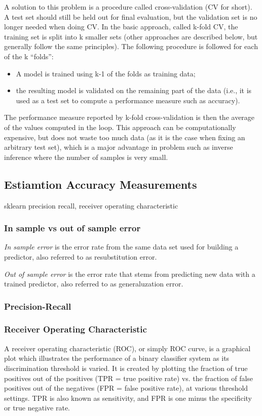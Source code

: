 \documentclass[11pt]{article}
\theoremstyle{plain}
\theoremstyle{definition}
\begin{document}
A solution to this problem is a procedure called cross-validation (CV for short). A test set should still be held out for final evaluation, but the validation set is no longer needed when doing CV. In the basic approach, called k-fold CV, the training set is split into k smaller sets (other approaches are described below, but generally follow the same principles). The following procedure is followed for each of the k “folds”:

\begin{itemize}
	\item A model is trained using k-1 of the folds as training data;
	\item the resulting model is validated on the remaining part of the data (i.e., it is used as a test set to compute a performance measure such as accuracy).
\end{itemize}
The performance measure reported by k-fold cross-validation is then the average of the values computed in the loop. This approach can be computationally expensive, but does not waste too much data (as it is the case when fixing an arbitrary test set), which is a major advantage in problem such as inverse inference where the number of samples is very small.

\subsection{Estiamtion Accuracy Measurements}
sklearn precision recall, receiver operating characteristic

\subsubsection{In sample vs out of sample error}
\textit{In sample error} is the error rate from the same data set used for building a predictor, also referred to as resubstitution error.

\textit{Out of sample error} is the error rate that stems from predicting new data with a trained predictor, also referred to as generaluzation error.

\subsubsection{Precision-Recall}


\subsubsection{Receiver Operating Characteristic}
A receiver operating characteristic (ROC), or simply ROC curve, is a graphical plot which illustrates the performance of a binary classifier system as its discrimination threshold is varied. It is created by plotting the fraction of true positives out of the positives (TPR = true positive rate) vs. the fraction of false positives out of the negatives (FPR = false positive rate), at various threshold settings. TPR is also known as sensitivity, and FPR is one minus the specificity or true negative rate.
\end{document}
